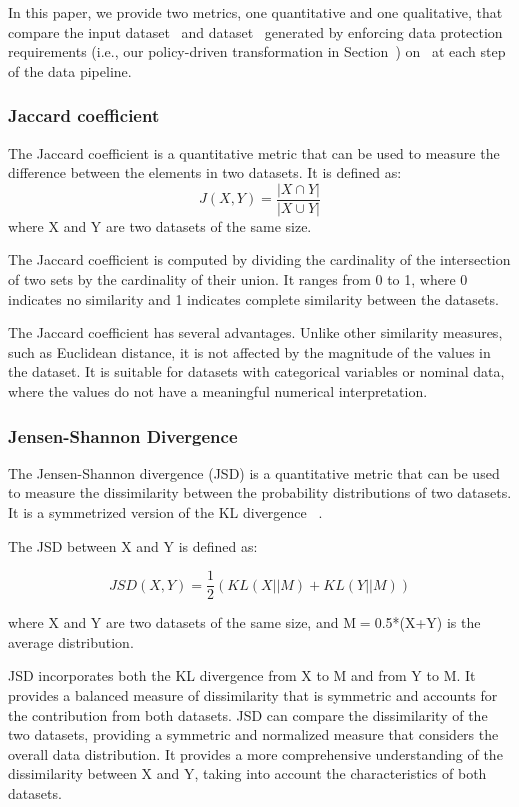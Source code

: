 In this paper, we provide two metrics, one quantitative and one qualitative, that compare the input dataset \origdataset\ and dataset \transdataset\ generated by enforcing data protection requirements (i.e., our policy-driven transformation in Section~\cite{ADD}) on \origdataset\ at each step of the data pipeline. 

\subsubsection{Jaccard coefficient}
The Jaccard coefficient is a quantitative metric that can be used to measure the difference between the elements in two datasets.
It is defined as:\[J(X,Y) = \frac{|X \cap Y|}{|X \cup Y|}\]
where X and Y are two datasets of the same size.

The Jaccard coefficient is computed by dividing the cardinality of the intersection of two sets by the cardinality of their union. It ranges from 0 to 1, where 0 indicates no similarity and 1 indicates complete similarity between the datasets.

The Jaccard coefficient has several advantages. Unlike other similarity measures, such as Euclidean distance, it is not affected by the magnitude of the values in the dataset. It is suitable for datasets with categorical variables or nominal data, where the values do not have a meaningful numerical interpretation.


\subsubsection{Jensen-Shannon Divergence}
The Jensen-Shannon divergence (JSD) is a quantitative metric that can be used to measure the dissimilarity between the probability distributions of two datasets. It is a symmetrized version of the KL divergence~\cite{ADD} .

The JSD between X and Y  is defined as:

\[JSD(X, Y) = \frac{1}{2} \left( KL(X || M)
  + KL(Y || M) \right)\]

where X and Y are two datasets of the same size, and M$=$0.5*(X+Y) is the average distribution.

JSD incorporates both the KL divergence from X to M and from Y to M. It provides a balanced measure of dissimilarity that is symmetric and accounts for the contribution from both datasets.
%
JSD can compare the dissimilarity of the two datasets, providing a symmetric and normalized measure that considers the overall data distribution.
%
It provides a more comprehensive understanding of the dissimilarity between X and Y, taking into account the characteristics of both datasets.

